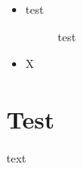 \documentclass{article}
\begin{document}



\begin{itemize}
\item{
\begin{description}
\item[test]{test}
\end{description}
}
\item{X}
\end{itemize}

\section{Test}

text
\end{document}
